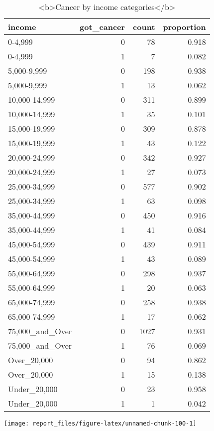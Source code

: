 \documentclass[
]{article}
\begin{document}
\begin{table}

\caption{\label{tab:unnamed-chunk-100}<b>Cancer by income categories</b>}
\centering
\begin{tabular}[t]{l|r|r|r}
\hline
income & got\_cancer & count & proportion\\
\hline
0-4,999 & 0 & 78 & 0.918\\
\hline
0-4,999 & 1 & 7 & 0.082\\
\hline
5,000-9,999 & 0 & 198 & 0.938\\
\hline
5,000-9,999 & 1 & 13 & 0.062\\
\hline
10,000-14,999 & 0 & 311 & 0.899\\
\hline
10,000-14,999 & 1 & 35 & 0.101\\
\hline
15,000-19,999 & 0 & 309 & 0.878\\
\hline
15,000-19,999 & 1 & 43 & 0.122\\
\hline
20,000-24,999 & 0 & 342 & 0.927\\
\hline
20,000-24,999 & 1 & 27 & 0.073\\
\hline
25,000-34,999 & 0 & 577 & 0.902\\
\hline
25,000-34,999 & 1 & 63 & 0.098\\
\hline
35,000-44,999 & 0 & 450 & 0.916\\
\hline
35,000-44,999 & 1 & 41 & 0.084\\
\hline
45,000-54,999 & 0 & 439 & 0.911\\
\hline
45,000-54,999 & 1 & 43 & 0.089\\
\hline
55,000-64,999 & 0 & 298 & 0.937\\
\hline
55,000-64,999 & 1 & 20 & 0.063\\
\hline
65,000-74,999 & 0 & 258 & 0.938\\
\hline
65,000-74,999 & 1 & 17 & 0.062\\
\hline
75,000\_and\_Over & 0 & 1027 & 0.931\\
\hline
75,000\_and\_Over & 1 & 76 & 0.069\\
\hline
Over\_20,000 & 0 & 94 & 0.862\\
\hline
Over\_20,000 & 1 & 15 & 0.138\\
\hline
Under\_20,000 & 0 & 23 & 0.958\\
\hline
Under\_20,000 & 1 & 1 & 0.042\\
\hline
\end{tabular}
\end{table}

\begin{center}\texttt{[image: report\_files/figure-latex/unnamed-chunk-100-1]} \end{center}
\end{document}
